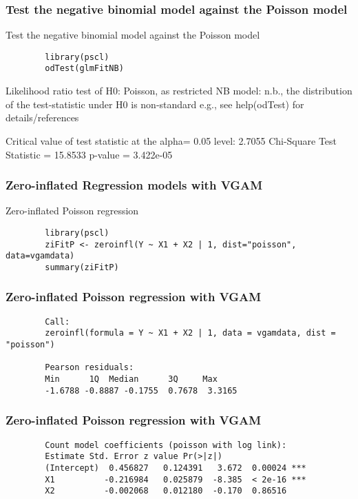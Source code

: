 \documentclass{beamer}
\begin{document}
	\begin{frame}[fragile]
		\frametitle{Test the negative binomial model against the Poisson model}
		Test the negative binomial model against the Poisson model
		\begin{verbatim}
		library(pscl)
		odTest(glmFitNB)
		\end{verbatim}
		Likelihood ratio test of H0: Poisson, as restricted NB model:
		n.b., the distribution of the test-statistic under H0 is non-standard
		e.g., see help(odTest) for details/references
		
		Critical value of test statistic at the alpha= 0.05 level: 2.7055 
		Chi-Square Test Statistic =  15.8533 p-value = 3.422e-05 
		
	\end{frame}
	\begin{frame}[fragile]
		\frametitle{Zero-inflated Regression models with VGAM}
		Zero-inflated Poisson regression
		\begin{verbatim}
		library(pscl)
		ziFitP <- zeroinfl(Y ~ X1 + X2 | 1, dist="poisson", data=vgamdata)
		summary(ziFitP)
		\end{verbatim}
	\end{frame}
	\begin{frame}[fragile]
		\frametitle{Zero-inflated Poisson regression with VGAM}
		\begin{verbatim}
		Call:
		zeroinfl(formula = Y ~ X1 + X2 | 1, data = vgamdata, dist = "poisson")
		
		Pearson residuals:
		Min      1Q  Median      3Q     Max 
		-1.6788 -0.8887 -0.1755  0.7678  3.3165 
		\end{verbatim}
	\end{frame}
	\begin{frame}[fragile]
		\frametitle{Zero-inflated Poisson regression with VGAM}
		\begin{verbatim}
		Count model coefficients (poisson with log link):
		Estimate Std. Error z value Pr(>|z|)    
		(Intercept)  0.456827   0.124391   3.672  0.00024 ***
		X1          -0.216984   0.025879  -8.385  < 2e-16 ***
		X2          -0.002068   0.012180  -0.170  0.86516    
		\end{verbatim}
	\end{frame}
\end{document}
